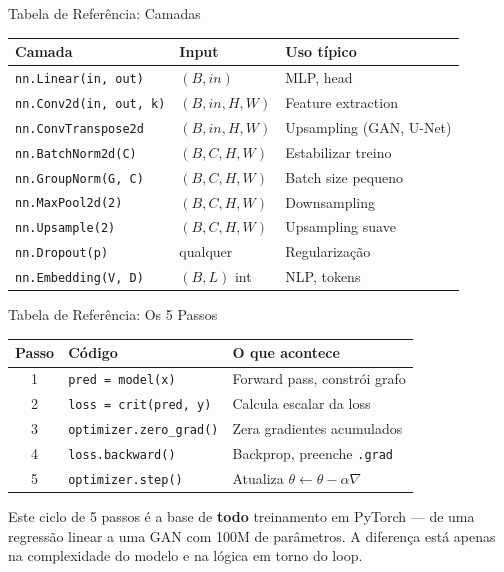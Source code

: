 \documentclass[aspectratio=169, 10pt]{beamer}
\begin{document}
\begin{frame}{Tabela de Referência: Camadas}
\centering
\small
\begin{tabular}{lll}
\toprule
\textbf{Camada} & \textbf{Input} & \textbf{Uso típico} \\
\midrule
\texttt{nn.Linear(in, out)} & $(B, in)$ & MLP, head \\
\texttt{nn.Conv2d(in, out, k)} & $(B, in, H, W)$ & Feature extraction \\
\texttt{nn.ConvTranspose2d} & $(B, in, H, W)$ & Upsampling (GAN, U-Net) \\
\texttt{nn.BatchNorm2d(C)} & $(B, C, H, W)$ & Estabilizar treino \\
\texttt{nn.GroupNorm(G, C)} & $(B, C, H, W)$ & Batch size pequeno \\
\texttt{nn.MaxPool2d(2)} & $(B, C, H, W)$ & Downsampling \\
\texttt{nn.Upsample(2)} & $(B, C, H, W)$ & Upsampling suave \\
\texttt{nn.Dropout(p)} & qualquer & Regularização \\
\texttt{nn.Embedding(V, D)} & $(B, L)$ int & NLP, tokens \\
\bottomrule
\end{tabular}
\end{frame}


\begin{frame}{Tabela de Referência: Os 5 Passos}
\centering
\begin{tabular}{cll}
\toprule
\textbf{Passo} & \textbf{Código} & \textbf{O que acontece} \\
\midrule
1 & \texttt{pred = model(x)} & Forward pass, constrói grafo \\
2 & \texttt{loss = crit(pred, y)} & Calcula escalar da loss \\
3 & \texttt{optimizer.zero\_grad()} & Zera gradientes acumulados \\
4 & \texttt{loss.backward()} & Backprop, preenche \texttt{.grad} \\
5 & \texttt{optimizer.step()} & Atualiza $\theta \leftarrow \theta - \alpha \nabla$ \\
\bottomrule
\end{tabular}

\vspace{1em}
\begin{destaque}
  Este ciclo de 5 passos é a base de \textbf{todo} treinamento em PyTorch — 
  de uma regressão linear a uma GAN com 100M de parâmetros.
  A diferença está apenas na complexidade do modelo e na lógica em torno do loop.
\end{destaque}
\end{frame}
\end{document}
